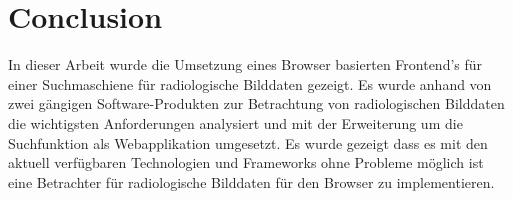 
\section{Conclusion}
\label{sec:conclusion}
In dieser Arbeit wurde die Umsetzung eines Browser basierten Frontend's für einer Suchmaschiene für radiologische Bilddaten gezeigt.
Es wurde anhand von zwei gängigen Software-Produkten zur Betrachtung von radiologischen Bilddaten die wichtigsten Anforderungen analysiert und mit der Erweiterung um die Suchfunktion als Webapplikation umgesetzt.
Es wurde gezeigt dass es mit den aktuell verfügbaren Technologien und Frameworks ohne Probleme möglich ist eine Betrachter für radiologische Bilddaten für den Browser zu implementieren.

